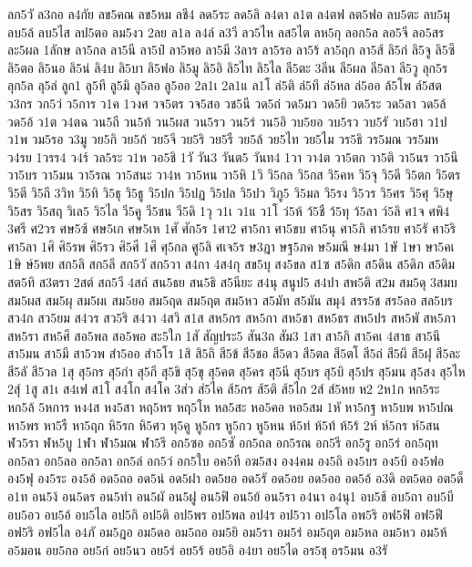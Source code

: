 {ลก5วั
ล3กอ
ล4กัย
ลข5คณ
ลข5หม
ลชี4
ลด5ระ
ลด5ลิ
ล4ดา
ล1ต
ล4ตฟ
ลต5ฟอ
ลบ5ตะ
ลบ5มุ
ลบ5ล้
ลบ5ไส
ลป5ตอ
ลม5งว
2ลย
ล1ล
ล4ล์
ล3วี
ลว5ไห
ลส5ไต
ลห5กุ
ลอก5ล
ลอ5จี
ลอ5สร
ละ5ผล
1ลักษ
ลา5กล
ลา5นี
ลา5ป๋
ลา5พอ
ลา5มี
3ลาร
ลา5รอ
ลา5ร้
ลา5ฤก
ลา5ส้
ลิ5ก่
ลิ5จู
ลิ5ซึ
ลิ5ตอ
ลิ5นอ
ลิ5น่
ลิ4บ
ลิ5บา
ลิ5ฟอ
ลิ5มู
ลิ5อิ
ลิ5ไท
ลิ5ไล
ลี5ตะ
3ลีน
ลี5ผล
ลี5ลา
ลี5วู
ลุก5ร
ลุก5ล
ลุ5ล่
ลูก1
ลู5ที
ลู5มิ
ลู5ลอ
ลู5ออ
2ล1เ
2ล1แ
ล1โ
ล่5ติ
ล่5ที
ล่5หล
ล่5ออ
ล้5โพ
ล์5สต
ว3กร
วก5ว่
ว5การ
ว1ค
1วงศ
วจ5ตร
วจ5สอ
วช5นี
วด5ถ่
วด5มว
วด5ยิ
วด5ระ
วด5ลา
วด5ล้
วด5อ้
ว1ต
ว4ตฉ
วน5ถี
วน5ท้
วน5ผส
วน5รว
วน5ร่
วน5อิ
วบ5ยอ
วบ5รว
วบ5รั
วบ5ฮา
ว1ป
ว1พ
วม5รอ
ว3มู
วย5กิ
วย5ก้
วย5จี
วย5ริ
วย5รื
วย5ล้
วย5ไท
วย5ไม
วร5ธิ
วร5มณ
วร5มห
ว4รย
1วรร4
ว4ร์
วล5ระ
ว1ห
วอ5ชิ
1วั
วัน3
วันต5
วันท4
1วา
วา4ต
วา5ตก
วา5ติ
วา5นร
วา5นึ
วา5บร
วา5มน
วา5รณ
วา5สนะ
วา4ห
วา5หน
วา5หิ
1วิ
วิ5กล
วิ5กส
วิ5คห
วิ5จุ
วิ5ดี
วิ5ตก
วิ5ตร
วิ5ตี
วิ5ถี
3วิท
วิ5ทิ
วิ5ธุ
วิ5ธู
วิ5ปก
วิ5ปฏ
วิ5ปล
วิ5ปว
วิภู5
วิ5มล
วิ5รง
วิ5วร
วิ5ศร
วิ5ศุ
วิ5ษุ
วิ5สร
วิ5สฤ
วิเล5
วิ5ไล
วี5คู
วี5ชน
วี5ดิ
1วุ
ว1เ
ว1แ
ว1โ
ว่5ห้
ว้5ชื
ว้5ทุ
ว้5ลา
ว์5ลิ
ศ1จ
ศพิ4
3ศรี
ศ2วร
ศษ5ซ้
ศษ5เก
ศษ5เห
1ศั
ศัก5ร
1ศา2
ศา5กา
ศา5ขบ
ศา5นุ
ศา5ภิ
ศา5รย
ศา5รั
ศา5ริ
ศา5ลา
1ศิ
ศิ5รพ
ศิ5รว
ศิ5ศี
1ศึ
ศุ5กล
ศู5ลิ
ศเจ5ร
ษ3ฎา
ษฐ5ภค
ษ5มณี
ษ4มา
1ษั
1ษา
ษา5คเ
1ษิ
ษ์5พย
สก5ลิ
สก5ลึ
สก5วั
สก5วา
ส4กา
4ส4กุ
สข5บุ
สง5ขล
ส1ซ
ส5ดิก
ส5ดิน
ส5ดิภ
ส5ดิม
สต5ทิ
ส3ตรา
2สต์
สถ5วี
4สถ์
สน5ธย
สน5ธิ
ส5นียะ
ส4นุ
สนูป5
ส4ปา
สพ5ติ
ส2ม
สม5ดุ
3สมบ
สม5ผส
สม5ผุ
สม5ผเ
สม5ยอ
สม5ฤด
สม5ฤต
สม5หว
ส5มัท
ส5มัน
สมุ4
สรร5ช
สร5ลอ
สล5บร
สว4ก
สว5ยม
ส4วร
สว5ริ
ส4วา
4สวิ
ส1ส
สห5กร
สห5กา
สห5ชา
สห5ธร
สห5ปร
สห5พั
สห5ภา
สห5รา
สห5ศึ
สอ5พล
สอ5พอ
สะ5ใภ
1สั
สัญประ5
สัน3ถ
สัม3
1สา
สา5กิ
สา5คเ
4สาธ
สา5นึ
สา5มน
สา5มี
สา5วพ
สำ5ออ
สำ5โร
1สิ
สิ5ถิ
สี5ข้
สี5ชอ
สี5ดว
สี5ตล
สี5ตโ
สี5ถ่
สี5ผึ
สี5ฝุ
สี5ละ
สี5ลั
สี5วล
1สุ
สุ5กร
สุ5กำ
สุ5กี
สุ5ขิ
สุ5ขุ
สุ5คต
สุ5คร
สุ5นี
สุ5บร
สุ5บิ
สุ5ปร
สุ5มน
สุ5สง
สุ5ไห
2สุ์
1สู
ส1เ
ส4เฟ
ส1โ
ส4โก
ส4โค
3ส่ว
ส่5ไค
ส้5กร
ส้5ติ
ส้5ไก
2ส์
ส์5หย
ห2
2ห1ก
หก5ระ
หก5ล้
5หการ
หง4ส
หง5สา
หฤ5หร
หฤ5โห
หล5สะ
หอ5คอ
หอ5สม
1หั
หา5กฐ
หา5บพ
หา5ปณ
หา5พร
หา5รื
หา5ฤก
หิ5รก
หิ5ศว
หุ5คู
หู5กร
หู5กว
หู5หน
ห้5ท่
ห้5ท้
ห้5ร้
2ห์
ห์5กร
ห์5สน
ฬว5รา
ฬห5บู
1ฬา
ฬา5มณ
ฬา5รึ
อก5ซอ
อก5ซั
อก5ถล
อก5รณ
อก5รี
อก5รู
อก5ร่
อก5ฤท
อก5ลว
อก5ลอ
อก5ลา
อก5ล่
อก5ว่
อก5ใบ
อค5ที
อฆ5สง
อง4คม
อง5ถิ
อง5บร
อง5บิ
อง5ฟอ
อง5ฟุ
อง5ระ
อง5อ้
อด5ถอ
อด5น่
อด5ฝา
อด5ยอ
อด5รั
อด5อย
อด5ออ
อด5อ้
อ3ดิ
อต5ดอ
อต5ด็
อ1ท
อน5ง้
อน5ดร
อน5ทำ
อน5ผั
อน5ฝู
อน5ฟิ
อน5ย้
อน5รา
อ4นา
อ4นุ1
อบ5ช้
อบ5ถา
อบ5บี
อบ5อว
อบ5อ้
อบ5ไล
อป5กิ
อป5ติ
อป5พร
อป5พล
อป4ร
อป5วา
อป5โล
อพ5ริ
อฟ5ฟิ
อฟ5ฟี
อฟ5ริ
อฟ5ไล
อ4ภั
อม5ฎอ
อม5ดอ
อม5ถอ
อม5ยิ
อม5รา
อม5ร่
อม5ฤต
อม5หล
อม5หว
อม5ห้
อ5มอน
อย5กอ
อย5ก๋
อย5นว
อย5ร่
อย5ร้
อย5อิ
อ4ยา
อย5ได
อร5ชุ
อร5มน
อ3รั
}
